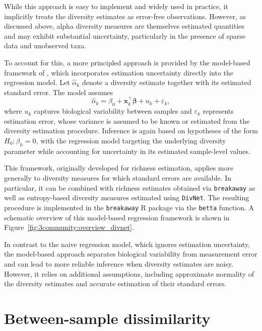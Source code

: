 While this approach is easy to implement and widely used in practice, it implicitly treats the diversity estimates as error-free observations. However, as discussed above, alpha diversity measures are themselves estimated quantities and may exhibit substantial uncertainty, particularly in the presence of sparse data and unobserved taxa.

To account for this, a more principled approach is provided by the model-based framework of \citet{willis2017improved}, which incorporates estimation uncertainty directly into the regression model. Let $\hat{\alpha}_k$ denote a diversity estimate together with its estimated standard error. The model assumes
\begin{equation}
\hat{\alpha}_k = \beta_0 + \mathbf{x}_k^\top \boldsymbol{\beta} + u_k + \varepsilon_k,
\end{equation}
where $u_k$ captures biological variability between samples and $\varepsilon_k$ represents estimation error, whose variance is assumed to be known or estimated from the diversity estimation procedure. Inference is again based on hypotheses of the form $H_0: \beta_h = 0$, with the regression model targeting the underlying diversity parameter while accounting for uncertainty in its estimated sample-level values.

This framework, originally developed for richness estimation, applies more generally to diversity measures for which standard errors are available. In particular, it can be combined with richness estimates obtained via \texttt{breakaway} as well as entropy-based diversity measures estimated using \texttt{DivNet}. The resulting procedure is implemented in the \texttt{breakaway} R package via the \texttt{betta} function. A schematic overview of this model-based regression framework is shown in Figure~\ref{fig:3community:overview_divnet}.

In contrast to the naive regression model, which ignores estimation uncertainty, the model-based approach separates biological variability from measurement error and can lead to more reliable inference when diversity estimates are noisy. However, it relies on additional assumptions, including approximate normality of the diversity estimates and accurate estimation of their standard errors.



\section{Between-sample dissimilarity}
\label{sec:3community:between_sample_diss}

